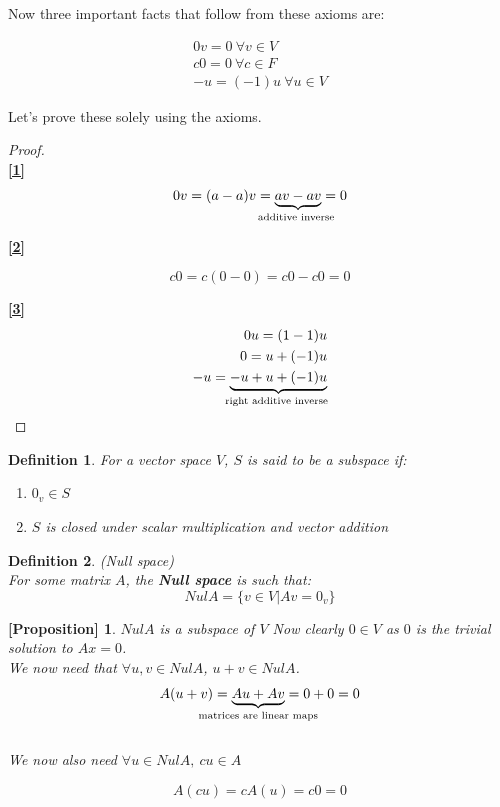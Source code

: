 \documentclass{article}
\newtheorem{prop}{[Proposition]}
\newtheorem{definition}{Definition}[subsection]
\numberwithin{equation}{subsection}
\begin{document}
Now three important facts that follow from these axioms are:

\begin{align}
    \label{1}0v = 0 \ \forall v \in V\\
    \label{2}c0 = 0 \ \forall c \in F\\
    \label{3}-u = (-1)u \ \forall u \in V
\end{align}

Let's prove these solely using the axioms. 
\begin{proof}
\\

\textbf{\ref{1}}
$$ 0v = (a-a)v = \underbrace{av - av}_{\text{\makebox[0pt]{additive inverse} }} = 0 $$

\textbf{\ref{2}}

$$ c0 = c(0-0) = c0 - c0 = 0$$

\textbf{\ref{3}}
\begin{align*}
    0u = (1-1)u\\
    0 = u + (-1)u\\
    -u = \underbrace{-u + u + (-1)u}_{\text{\makebox[0pt]{right additive inverse} }}
\end{align*}
\end{proof}


\begin{definition}
For a vector space $V$, $S$ is said to be a subspace if:

\begin{enumerate}
    \item $0_{v} \in S$
    \item $S$ is closed under scalar multiplication and vector addition
\end{enumerate}
\end{definition}

\begin{definition}(Null space)
\\
For some matrix $A$, the \textbf{Null space} is such that:
$$Nul A = \{v\in V| Av = 0_{v}\} $$
\end{definition}

\begin{prop}
$Nul A$ is a subspace of $V$
Now clearly $0 \in V$ as $0$ is the trivial solution to $Ax = 0$.
\\
We now need that $\forall u,v \in Nul A$, $u+v \in Nul A$.
$$A(u+v) = \underbrace{Au + Av}_{\text{\makebox[0pt]{matrices are linear maps}}} = 0 + 0 = 0$$
\\
We now also need $\forall u \in Nul A, \ cu \in A$

$$ A(cu) = cA(u) = c0 = 0$$
\end{prop}
\end{document}
